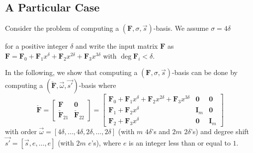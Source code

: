 \subsection{\label{sub:particularCase}A Particular Case}

Consider the problem of computing a $\left(\mathbf{F},\sigma,\vec{s}\right)$-basis.
We assume $\sigma=4\delta$ %
\begin{comment}
(The results below hold for any positive integer great than one, but
4 is used for simplicity. ) 
\end{comment}
{}for a positive integer $\delta$ and write the input matrix $\mathbf{F}$
as $\mathbf{F}=\mathbf{F}_{0}+\mathbf{F}_{1}x^{\delta}+\mathbf{F}_{2}x^{2\delta}+\mathbf{F}_{3}x^{3\delta}$
with $\deg\mathbf{F}_{i}<\delta$.%
\begin{comment}
again, changed from $\deg\mathbf{F}_{i}\le\delta-1$ to $\deg\mathbf{F}_{i}<\delta$
even though I prefer $\le$ 
\end{comment}
{} In the following, we show that computing a $\left(\mathbf{F},\sigma,\vec{s}\right)$-basis
can be done by computing a $(\check{\mathbf{F}},\vec{\omega},\vec{s'})$-basis
where \begin{equation}
\check{\mathbf{F}}=\left[\begin{array}{cc}
\mathbf{F} & \mathbf{0}\\
\check{\mathbf{F}}_{21} & \check{\mathbf{F}}_{22}\end{array}\right]=\left[\begin{array}{l|cr}
\mathbf{F}_{0}+\mathbf{F}_{1}x^{\delta}+\mathbf{F}_{2}x^{2\delta}+\mathbf{F}_{3}x^{3\delta} & \mathbf{0} & \mathbf{0}\\
\hline \mathbf{F}_{1}+\mathbf{F}_{2}x^{\delta} & \mathbf{I}_{m} & \mathbf{0}\\
\mathbf{F}_{2}+\mathbf{F}_{3}x^{\delta} & \mathbf{0} & \mathbf{I}_{m}\end{array}\right]\label{eq:extendedSTransformTop}\end{equation}
 with order $\vec{\omega}=\left[4\delta,\dots,4\delta,2\delta,\dots,2\delta\right]$
(with $m$ $4\delta$'s and $2m$ $2\delta$'s) and degree shift $\vec{s'}=\left[\vec{s},e,\dots,e\right]$
(with $2m$ $e$'s), where $e$ is an integer less than or equal to
$1$. %
\begin{comment}
actually true for $e\le\min\vec{s}+1$. keeping this $e$ helps to
show that this hold true in more general situations, while Storjohann
only used $e=1$. it can be negative as well. 
\end{comment}
